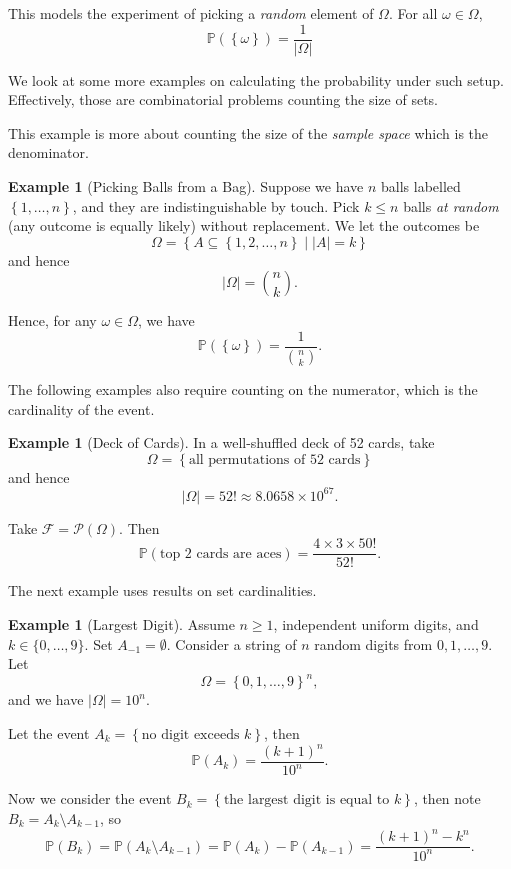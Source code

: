 \documentclass[11pt]{article}
\numberwithin{equation}{section}
\theoremstyle{definition}
\newtheorem{example}[theorem]{Example}
\theoremstyle{remark}
\newcommand{\pqty}[1]{\left(#1\right)}
\newcommand{\Bqty}[1]{\left\{#1\right\}}
\newcommand{\abs}[1]{\left|#1\right|}
\newcommand{\set}[2]{\left\{#1\mid #2\right\}}
\newcommand{\powerset}{\mathcal P}
\newcommand{\eventSpace}{\mathcal F}
\newcommand{\Prob}{\mathbb P}
\begin{document}
This models the experiment of picking a \emph{random} element of \(\Omega\). For all \(\omega \in \Omega\),
\[
    \Prob\pqty{\Bqty{\omega}} = \frac{1}{\abs{\Omega}}
\]

We look at some more examples on calculating the probability under such setup. Effectively, those are combinatorial problems counting the size of sets.

This example is more about counting the size of the \emph{sample space} which is the denominator.

\begin{example}[Picking Balls from a Bag]\label{probability-example-002}
    \label{probability-ex:picking-balls-from-bag}%
    Suppose we have \(n\) balls labelled \(\Bqty{1, \ldots, n}\), and they are indistinguishable by touch. Pick \(k \leq n\) balls \emph{at random} (any outcome is equally likely) without replacement. We let the outcomes be
    \[
        \Omega = \set{A \subseteq \Bqty{1, 2, \ldots, n}}{\abs{A} = k}
    \]
    and hence
    \[
        \abs{\Omega} = \binom{n}{k}.
    \]

    Hence, for any \(\omega \in \Omega\), we have
    \[
        \Prob\pqty{\Bqty{\omega}} = \frac{1}{\binom{n}{k}}.
    \]
\end{example}

The following examples also require counting on the numerator, which is the cardinality of the event.

\begin{example}[Deck of Cards]\label{probability-example-003}
    \label{probability-ex:deck-of-cards}%
    In a well-shuffled deck of 52 cards, take
    \[
        \Omega = \Bqty{\text{all permutations of 52 cards}}
    \]
    and hence
    \[
        \abs{\Omega} = 52! \approx 8.0658\times10^{67}.
    \]
    
    Take \(\eventSpace = \powerset\pqty{\Omega}\). Then
    \[
        \Prob\pqty{\text{top 2 cards are aces}} = \frac{4 \times 3 \times 50!}{52!}.
    \]
\end{example}

The next example uses results on set cardinalities.

\begin{example}[Largest Digit]\label{probability-example-004}
    \label{probability-ex:largest-digit}
Assume \(n\ge1\), independent uniform digits, and \(k\in\{0,\ldots,9\}\). Set \(A_{-1}=\emptyset\).
%
    Consider a string of \(n\) random digits from \(0, 1, \ldots, 9\). Let
    \[
        \Omega = \Bqty{0, 1, \ldots, 9}^n,
    \]
    and we have \(\abs{\Omega} = 10^n\).

    Let the event \(A_k = \Bqty{\text{no digit exceeds }k}\), then
    \[
        \Prob\pqty{A_k} = \frac{\pqty{k + 1}^{n}}{10^n}.
    \]

    Now we consider the event \(B_k = \Bqty{\text{the largest digit is equal to }k}\), then note \(B_k = A_k \setminus A_{k - 1}\), so
    \[
        \Prob\pqty{B_k} = \Prob\pqty{A_k \setminus A_{k - 1}} = \Prob\pqty{A_k} - \Prob\pqty{A_{k - 1}} = \frac{\pqty{k + 1}^n - k^n}{10^n}.
    \]
\end{example}
\end{document}
